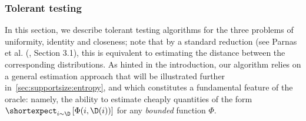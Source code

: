  \subsubsection{Tolerant testing}\label{sec:uniformity:equivalence:identity:testing:tolerant}
In this section, we describe tolerant testing algorithms for the three problems of uniformity, identity and closeness; note that by a standard reduction (see Parnas et al. (\cite{PRR:2006}, Section 3.1), this is equivalent to estimating the distance between the corresponding distributions. As hinted in the introduction, our algorithm relies on a general estimation approach that will be illustrated further in~\cref{sec:supportsize:entropy}, and which constitutes a fundamental feature of the \pdfsamp oracle: namely, the ability to estimate cheaply quantities of the form
$\shortexpect_{i\sim \D}\left[ \Phi(i,\D(i)) \right]$ for any \emph{bounded} function $\Phi$.

